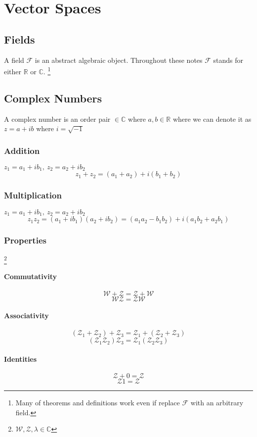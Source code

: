 \chapter{Vector Spaces}
\section{Fields}
A field $\mathcal{F}$ is an abstract algebraic object. Throughout these notes $\mathcal{F}$ stands for either $\mathbb{R}$ or $\mathbb{C}$. \footnote{Many of theorems and definitions work even if replace $\mathcal{F}$ with an arbitrary field.}
\section{Complex Numbers}
A complex number is an order pair ${} \in \mathbb{C}$ where $a,b \in \mathbb{R}$ where we can denote it as $z = a + ib$ where $i = \sqrt{-1}$
\subsection{Addition}
$z_{1} = a_{1} + ib_{1}, \ z_{2} = a_{2} + ib_{2}$
$$z_{1} + z_{2} =  (a_{1} + a_{2}) + i(b_{1} + b_{2})$$
\subsection{Multiplication}
$z_{1} = a_{1} + ib_{1}, \ z_{2} = a_{2} + ib_{2}$
$$z_{1}z_{2} =  (a_{1} + ib_{1})(a_{2} + ib_{2}) = (a_{1}a_{2} - b_{1}b_{2}) + i(a_{1}b_{2} + a_{2}b_{1})$$
\subsection{Properties}\footnote{$\mathcal{W}, \mathcal{Z}, \lambda \in \mathbb{C}$}
\subsubsection{Commutativity}
$$\mathcal{W} + \mathcal{Z} = \mathcal{Z} + \mathcal{W}$$
$$\mathcal{W}\mathcal{Z} = \mathcal{Z}\mathcal{W}$$
\subsubsection{Associativity}
$$(\mathcal{Z}_1 + \mathcal{Z}_2) + \mathcal{Z}_3 = \mathcal{Z}_1 + (\mathcal{Z}_2 + \mathcal{Z}_3)$$
$$(\mathcal{Z}_1\mathcal{Z}_2)\mathcal{Z}_3 = \mathcal{Z}_1(\mathcal{Z}_2\mathcal{Z}_3)$$
\subsubsection{Identities}
$$\mathcal{Z} + 0 = \mathcal{Z}$$
$$\mathcal{Z}1 = \mathcal{Z}$$

